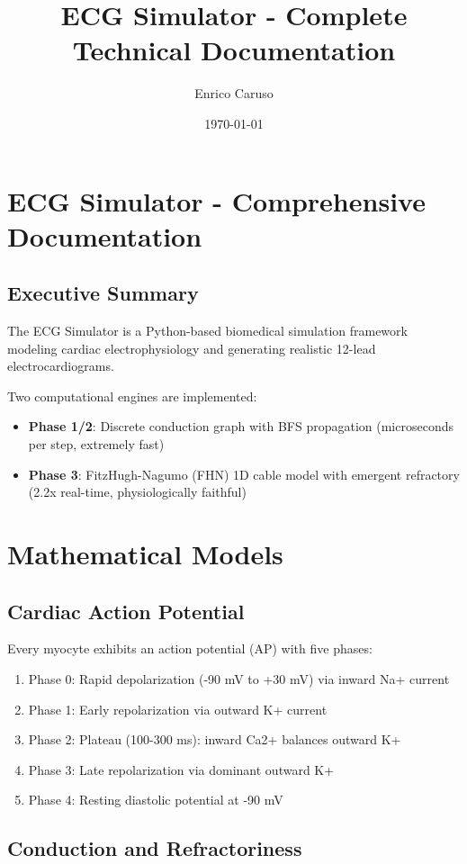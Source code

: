 \documentclass[12pt,a4paper]{article}
\title{ECG Simulator - Complete Technical Documentation}
\author{Enrico Caruso}
\date{\today}
\begin{document}
\section*{ECG Simulator - Comprehensive Documentation}

\subsection*{Executive Summary}

The ECG Simulator is a Python-based biomedical simulation framework modeling cardiac electrophysiology and generating realistic 12-lead electrocardiograms.

Two computational engines are implemented:
\begin{itemize}
\item \textbf{Phase 1/2}: Discrete conduction graph with BFS propagation (microseconds per step, extremely fast)
\item \textbf{Phase 3}: FitzHugh-Nagumo (FHN) 1D cable model with emergent refractory (2.2x real-time, physiologically faithful)
\end{itemize}

\section*{Mathematical Models}

\subsection*{Cardiac Action Potential}

Every myocyte exhibits an action potential (AP) with five phases:

\begin{enumerate}
\item Phase 0: Rapid depolarization (-90 mV to +30 mV) via inward Na+ current
\item Phase 1: Early repolarization via outward K+ current  
\item Phase 2: Plateau (100-300 ms): inward Ca2+ balances outward K+
\item Phase 3: Late repolarization via dominant outward K+
\item Phase 4: Resting diastolic potential at -90 mV
\end{enumerate}

\subsection*{Conduction and Refractoriness}
\end{document}
